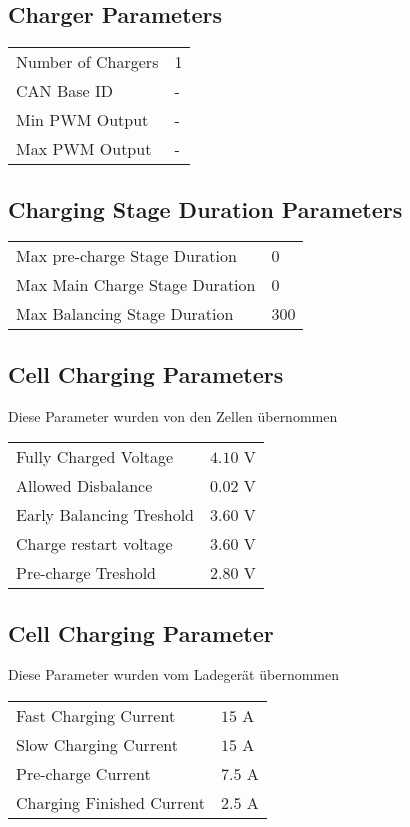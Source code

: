\subsection*{Charger Parameters}
\begin{tabular}{p{11cm}p{2cm}}
	Number of Chargers & 1 \\
	CAN Base ID & - \\
	Min PWM Output & - \\
	Max PWM Output & -
\end{tabular}
\subsection*{Charging Stage Duration Parameters}
\begin{tabular}{p{11cm}p{2cm}}
	Max pre-charge Stage Duration & 0 \\
	Max Main Charge Stage Duration & 0 \\
	Max Balancing Stage Duration & 300
\end{tabular}
\subsection*{Cell Charging Parameters}
Diese Parameter wurden von den Zellen übernommen \cite{lev50}\\
\begin{tabular}{p{11cm}p{2cm}}
	Fully Charged Voltage & $4.10$ V \\
	Allowed Disbalance & $0.02$ V \\
	Early Balancing Treshold & $3.60$ V \\
	Charge restart voltage & $3.60$ V \\
	Pre-charge Treshold & $2.80$ V
\end{tabular}
\subsection*{Cell Charging Parameter}
Diese Parameter wurden vom Ladegerät übernommen \cite{ladegeraet}\\
\begin{tabular}{p{11cm}p{2cm}}
	Fast Charging Current & $15$ A \\
	Slow Charging Current & $15$ A \\
	Pre-charge Current & $7.5$ A \\
	Charging Finished Current & $2.5$ A
\end{tabular}


